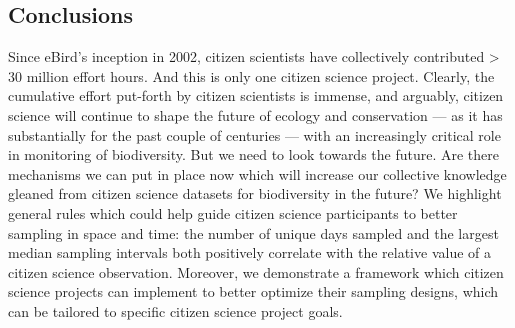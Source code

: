 \documentclass[9pt,twocolumn,twoside,lineno]{pnas-new}
\begin{document}
\subsection*{Conclusions}
Since eBird's inception in 2002, citizen scientists have collectively contributed > 30 million effort hours. And this is only one citizen science project. Clearly, the cumulative effort put-forth by citizen scientists is immense, and arguably, citizen science will continue to shape the future of ecology and conservation --- as it has substantially for the past couple of centuries \cite{silvertown2009new} --- with an increasingly critical role in monitoring of biodiversity\cite{mckinley2017citizen, pocock2018vision}. But we need to look towards the future. Are there mechanisms we can put in place now which will increase our collective knowledge gleaned from citizen science datasets for biodiversity in the future? We highlight general rules which could help guide citizen science participants to better sampling in space and time: the number of unique days sampled and the largest median sampling intervals both positively correlate with the relative value of a citizen science observation. Moreover, we demonstrate a framework which citizen science projects can implement to better optimize their sampling designs, which can be tailored to specific citizen science project goals.
\end{document}
